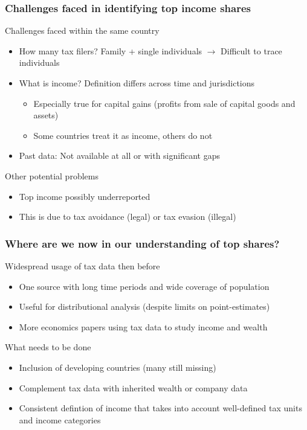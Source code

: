 \documentclass[aspectratio=169]{beamer}
\begin{document}
\begin{frame}
\frametitle{Challenges faced in identifying top income shares} 
Challenges faced within the same country
\begin{itemize}\setlength\itemsep{3pt}
\item How many tax filers? Family + single individuals $\to$ Difficult to trace individuals
\item What is income? Definition differs across time and jurisdictions
\begin{itemize}
\item Especially true for capital gains (profits from sale of capital goods and assets)
\item Some countries treat it as income, others do not
\end{itemize}
\item Past data: Not available at all or with significant gaps
\end{itemize}\medskip
Other potential problems
\begin{itemize}\setlength\itemsep{3pt}
\item Top income possibly underreported
\item This is due to tax avoidance (legal) or tax evasion (illegal)
\end{itemize}
\end{frame}


\begin{frame}
\frametitle{Where are we now in our understanding of top shares?} 
Widespread usage of tax data then before
\begin{itemize}\setlength\itemsep{3pt}
\item One source with long time periods and wide coverage of population
\item Useful for distributional analysis (despite limits on point-estimates)
\item More economics papers using tax data to study income and wealth
\end{itemize}\medskip
What needs to be done
\begin{itemize}\setlength\itemsep{3pt}
\item Inclusion of developing countries (many still missing)
\item Complement tax data with inherited wealth or company data
\item Consistent defintion of income that takes into account well-defined tax units and income categories
\end{itemize}\medskip
\end{frame}
\end{document}
